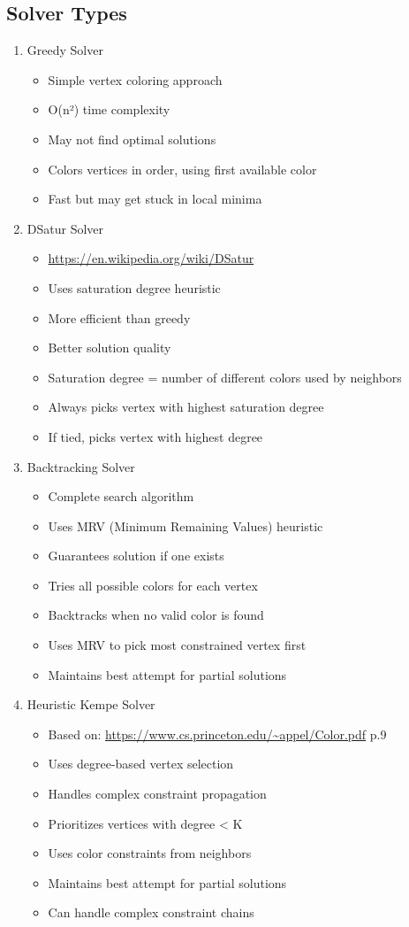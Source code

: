 \documentclass[11pt]{article}
\begin{document}
\subsection{Solver Types}
\label{sec:org2f036af}
\begin{enumerate}
\item Greedy Solver
\begin{itemize}
\item Simple vertex coloring approach
\item O(n²) time complexity
\item May not find optimal solutions
\item Colors vertices in order, using first available color
\item Fast but may get stuck in local minima
\end{itemize}

\item DSatur Solver
\begin{itemize}
\item \url{https://en.wikipedia.org/wiki/DSatur}
\item Uses saturation degree heuristic
\item More efficient than greedy
\item Better solution quality
\item Saturation degree = number of different colors used by neighbors
\item Always picks vertex with highest saturation degree
\item If tied, picks vertex with highest degree
\end{itemize}

\item Backtracking Solver
\begin{itemize}
\item Complete search algorithm
\item Uses MRV (Minimum Remaining Values) heuristic
\item Guarantees solution if one exists
\item Tries all possible colors for each vertex
\item Backtracks when no valid color is found
\item Uses MRV to pick most constrained vertex first
\item Maintains best attempt for partial solutions
\end{itemize}

\item Heuristic Kempe Solver
\begin{itemize}
\item Based on: \url{https://www.cs.princeton.edu/\~appel/Color.pdf} p.9
\item Uses degree-based vertex selection
\item Handles complex constraint propagation
\item Prioritizes vertices with degree < K
\item Uses color constraints from neighbors
\item Maintains best attempt for partial solutions
\item Can handle complex constraint chains
\end{itemize}
\end{enumerate}
\end{document}

